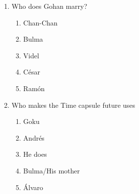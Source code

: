 \documentclass[letterpaper,addpoints,answers,twocolumn,10pt]{exam}
\begin{document}
\begin{enumerate}[leftmargin=.2in]
\begin{enumerate}[noitemsep,leftmargin=0in]
\end{enumerate}



\item  Who does Gohan marry?


\begin{enumerate}[noitemsep,leftmargin=0in]


\item  Chan-Chan
\item  Bulma
\item  Videl
\item  César
\item  Ramón


\end{enumerate}



\item  Who makes the Time capsule future uses


\begin{enumerate}[noitemsep,leftmargin=0in]


\item  Goku
\item  Andrés
\item  He does
\item  Bulma/His mother
\item  Álvaro


\end{enumerate}



\end{enumerate}
\end{document}
